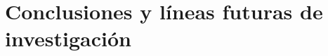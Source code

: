 \documentclass[12pt, a4paper, twoside]{article}
\begin{document}
\section{Conclusiones y líneas futuras de investigación}


\nocite{*}
\printbibliography

\newpage

%     


\end{document}
